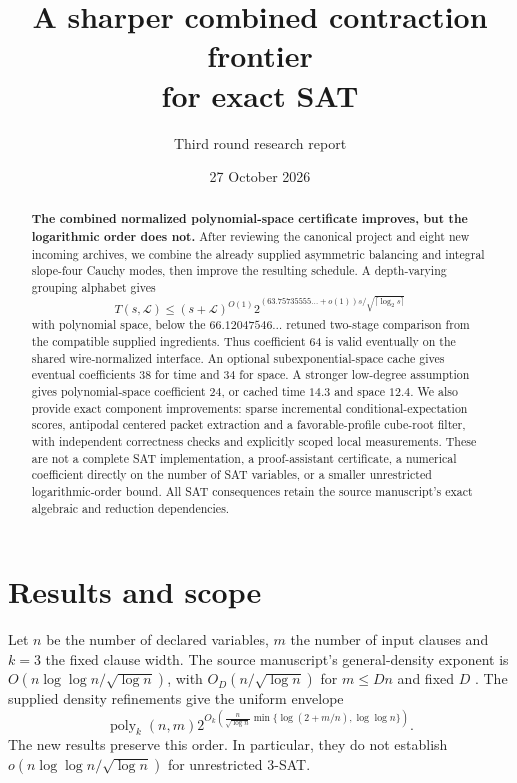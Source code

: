 \documentclass[11pt,letterpaper]{article}
\title{\vspace{-1.5em}A sharper combined contraction frontier\\for exact SAT}
\author{Third round research report}\date{27 October 2026}
\newcommand{\poly}{\operatorname{poly}}\newcommand{\polylog}{\operatorname{polylog}}
\theoremstyle{remark}\newtheorem{remark}[theorem]{Remark}
\begin{document}
\maketitle\vspace{-1.5em}
\begin{abstract}
\noindent\textbf{The combined normalized polynomial-space certificate improves, but the logarithmic order does not.}
After reviewing the canonical project and eight new incoming archives, we combine the already supplied asymmetric balancing and integral slope-four Cauchy modes, then improve the resulting schedule. A depth-varying grouping alphabet gives
\[
 T(s,\mathcal L)\le(s+\mathcal L)^{O(1)}
 2^{(63.75735555\ldots+o(1))s/\sqrt{\lceil\log_2s\rceil}}
\]
with polynomial space, below the $66.12047546\ldots$ retuned two-stage comparison from the compatible supplied ingredients. Thus coefficient $64$ is valid eventually on the shared wire-normalized interface. An optional subexponential-space cache gives eventual coefficients $38$ for time and $34$ for space. A stronger low-degree assumption gives polynomial-space coefficient $24$, or cached time $14.3$ and space $12.4$. We also provide exact component improvements: sparse incremental conditional-expectation scores, antipodal centered packet extraction and a favorable-profile cube-root filter, with independent correctness checks and explicitly scoped local measurements. These are not a complete SAT implementation, a proof-assistant certificate, a numerical coefficient directly on the number of SAT variables, or a smaller unrestricted logarithmic-order bound. All SAT consequences retain the source manuscript's exact algebraic and reduction dependencies.
\end{abstract}

\section{Results and scope}
Let $n$ be the number of declared variables, $m$ the number of input clauses and $k=3$ the fixed clause width. The source manuscript's general-density exponent is
$O(n\log\log n/\sqrt{\log n})$, with $O_D(n/\sqrt{\log n})$ for $m\le Dn$ and fixed $D$ \cite{openai,reduction}.
The supplied density refinements give the uniform envelope
\begin{equation}\label{eq:density}
 \poly_k(n,m)2^{O_k\left(\frac{n}{\sqrt{\log n}}
 \min\{\log(2+m/n),\log\log n\}\right)}.
\end{equation}
The new results preserve this order. In particular, they do not establish
$o(n\log\log n/\sqrt{\log n})$ for unrestricted 3-SAT.
\end{document}
